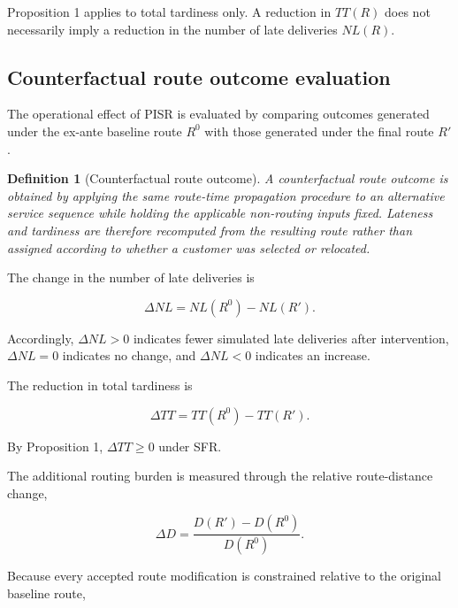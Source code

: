 \documentclass[11pt,a4paper]{article}
\newtheorem{definition}{Definition}
\begin{document}
Proposition 1 applies to total tardiness only. A reduction in \(TT(R)\)
does not necessarily imply a reduction in the number of late deliveries
\(NL(R)\).

\subsection{Counterfactual route outcome evaluation}\label{sec:counterfactual-evaluation}

The operational effect of PISR is evaluated by comparing outcomes
generated under the ex-ante baseline route \(R^{0}\) with those
generated under the final route \(R'\).

\begin{definition}[Counterfactual route outcome]
A counterfactual route outcome is obtained by applying the same route-time propagation procedure to an alternative service sequence while holding the applicable non-routing inputs fixed. Lateness and tardiness are therefore recomputed from the resulting route rather than assigned according to whether a customer was selected or relocated.
\end{definition}

The change in the number of late deliveries is

\begin{equation}
\Delta NL = NL\left( R^{0} \right) - NL\left( R' \right).
\label{eq:19}
\end{equation}

Accordingly, \(\Delta NL > 0\) indicates fewer simulated late deliveries
after intervention, \(\Delta NL = 0\) indicates no change, and
\(\Delta NL < 0\) indicates an increase.

The reduction in total tardiness is

\begin{equation}
\Delta TT = TT\left( R^{0} \right) - TT\left( R' \right).
\label{eq:20}
\end{equation}

By Proposition 1, \(\Delta TT \geq 0\) under SFR.

The additional routing burden is measured through the relative
route-distance change,

\begin{equation}
\Delta D = \frac{D\left( R' \right) - D\left( R^{0} \right)}{D\left( R^{0} \right)}.
\label{eq:21}
\end{equation}

Because every accepted route modification is constrained relative to the
original baseline route,
\end{document}
